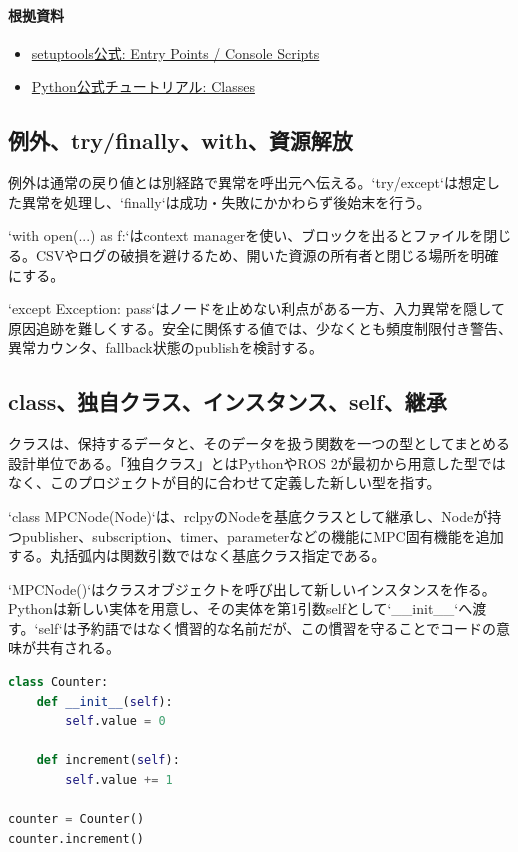 \documentclass[a4paper,11pt]{article}
\begin{document}
\paragraph{根拠資料}
\begin{itemize}[leftmargin=1.6em]
\item \href{https://setuptools.pypa.io/en/latest/userguide/entry_point.html}{setuptools公式: Entry Points / Console Scripts}
\item \href{https://docs.python.org/3/tutorial/classes.html}{Python公式チュートリアル: Classes}
\end{itemize}

\subsection{例外、try/finally、with、資源解放}
例外は通常の戻り値とは別経路で異常を呼出元へ伝える。`try/except`は想定した異常を処理し、`finally`は成功・失敗にかかわらず後始末を行う。


`with open(...) as f:`はcontext managerを使い、ブロックを出るとファイルを閉じる。CSVやログの破損を避けるため、開いた資源の所有者と閉じる場所を明確にする。


`except Exception: pass`はノードを止めない利点がある一方、入力異常を隠して原因追跡を難しくする。安全に関係する値では、少なくとも頻度制限付き警告、異常カウンタ、fallback状態のpublishを検討する。



\subsection{class、独自クラス、インスタンス、self、継承}
クラスは、保持するデータと、そのデータを扱う関数を一つの型としてまとめる設計単位である。「独自クラス」とはPythonやROS 2が最初から用意した型ではなく、このプロジェクトが目的に合わせて定義した新しい型を指す。


`class MPCNode(Node)`は、rclpyのNodeを基底クラスとして継承し、Nodeが持つpublisher、subscription、timer、parameterなどの機能にMPC固有機能を追加する。丸括弧内は関数引数ではなく基底クラス指定である。


`MPCNode()`はクラスオブジェクトを呼び出して新しいインスタンスを作る。Pythonは新しい実体を用意し、その実体を第1引数selfとして`\_\_init\_\_`へ渡す。`self`は予約語ではなく慣習的な名前だが、この慣習を守ることでコードの意味が共有される。


\begin{lstlisting}[language=python]
class Counter:
    def __init__(self):
        self.value = 0

    def increment(self):
        self.value += 1

counter = Counter()
counter.increment()
\end{lstlisting}
\end{document}
